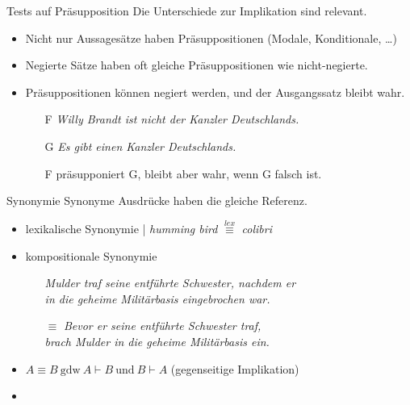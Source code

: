 \begin{frame}
  {Tests auf Präsupposition}
  \onslide<+->
  \onslide<+->
  Die Unterschiede zur Implikation sind relevant.\\
  \Halbzeile
  \begin{itemize}[<+->]
    \item Nicht nur Aussagesätze haben Präsuppositionen (Modale, Konditionale, \ldots)
    \item Negierte Sätze haben oft gleiche Präsuppositionen wie nicht-negierte.
    \item Präsuppositionen können negiert werden, und der Ausgangssatz bleibt wahr.\\
      \begin{itemize}[<+->]
        \item[F] \textit{Willy Brandt ist nicht der Kanzler Deutschlands.}
        \item[G] \textit{Es gibt einen Kanzler Deutschlands.}
        \item[ ] F präsupponiert G, bleibt aber wahr, wenn G falsch ist.
      \end{itemize}
  \end{itemize}
\end{frame}

\begin{frame}
  {Synonymie}
  \onslide<+->
  \onslide<+->
  Synonyme Ausdrücke haben  \alert{die gleiche Referenz}.\\
  \Halbzeile
  \begin{itemize}[<+->]
    \item lexikalische Synonymie | \textit{humming bird} $\stackrel{lex}{\equiv}$ \textit{colibri}
      \Halbzeile
    \item kompositionale Synonymie
      \begin{itemize}[<+->]
        \item[ ] \textit{Mulder traf seine entführte Schwester, nachdem er\\
          in die geheime Militärbasis eingebrochen war.}
        \item[$\equiv$] \textit{Bevor er seine entführte Schwester traf,\\
          brach Mulder in die geheime Militärbasis ein.}
      \end{itemize}
    \Halbzeile
    \item \alert{$A\equiv B\ \text{gdw}\ A\vdash B\ \text{und}\ B\vdash A$} (gegenseitige Implikation)
    \item {}
  \end{itemize}
\end{frame}

